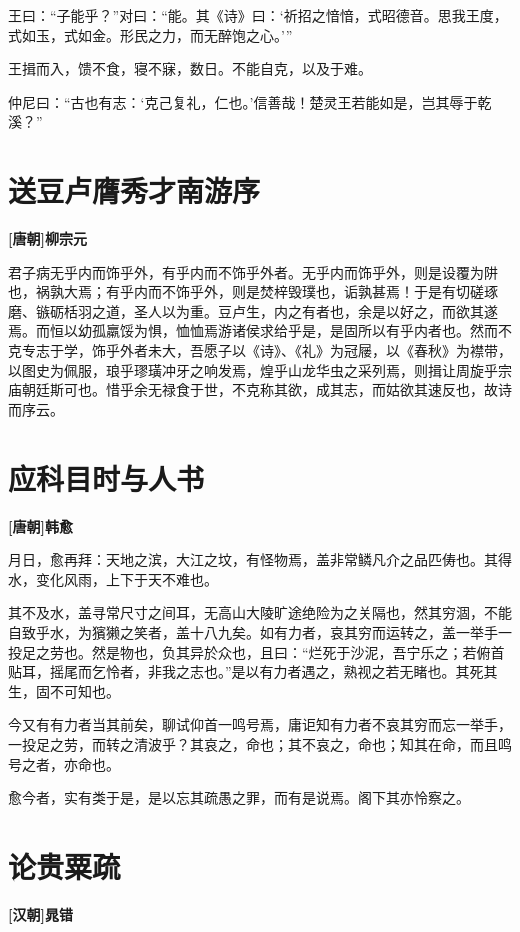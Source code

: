\documentclass[UTF8,titlepage,oneside]{ctexbook}
\begin{document}
王曰：“子能乎？”对曰：“能。其《诗》曰：‘祈招之愔愔，式昭德音。思我王度，式如玉，式如金。形民之力，而无醉饱之心。’”


王揖而入，馈不食，寝不寐，数日。不能自克，以及于难。


仲尼曰：“古也有志：‘克己复礼，仁也。’信善哉！楚灵王若能如是，岂其辱于乾溪？”



\chapter*{送豆卢膺秀才南游序}
\begin{center}
	\textbf{[唐朝]柳宗元}
\end{center}


君子病无乎内而饰乎外，有乎内而不饰乎外者。无乎内而饰乎外，则是设覆为阱也，祸孰大焉；有乎内而不饰乎外，则是焚梓毁璞也，诟孰甚焉！于是有切磋琢磨、镞砺栝羽之道，圣人以为重。豆卢生，内之有者也，余是以好之，而欲其遂焉。而恒以幼孤羸馁为惧，恤恤焉游诸侯求给乎是，是固所以有乎内者也。然而不克专志于学，饰乎外者未大，吾愿子以《诗》、《礼》为冠屦，以《春秋》为襟带，以图史为佩服，琅乎璆璜冲牙之响发焉，煌乎山龙华虫之采列焉，则揖让周旋乎宗庙朝廷斯可也。惜乎余无禄食于世，不克称其欲，成其志，而姑欲其速反也，故诗而序云。

\chapter*{应科目时与人书}
\begin{center}
	\textbf{[唐朝]韩愈}
\end{center}

月日，愈再拜：天地之滨，大江之坟，有怪物焉，盖非常鳞凡介之品匹俦也。其得水，变化风雨，上下于天不难也。

其不及水，盖寻常尺寸之间耳，无高山大陵旷途绝险为之关隔也，然其穷涸，不能自致乎水，为獱獭之笑者，盖十八九矣。如有力者，哀其穷而运转之，盖一举手一投足之劳也。然是物也，负其异於众也，且曰：“烂死于沙泥，吾宁乐之；若俯首贴耳，摇尾而乞怜者，非我之志也。”是以有力者遇之，熟视之若无睹也。其死其生，固不可知也。

今又有有力者当其前矣，聊试仰首一鸣号焉，庸讵知有力者不哀其穷而忘一举手，一投足之劳，而转之清波乎？其哀之，命也；其不哀之，命也；知其在命，而且鸣号之者，亦命也。

愈今者，实有类于是，是以忘其疏愚之罪，而有是说焉。阁下其亦怜察之。


\chapter*{论贵粟疏}
\begin{center}
	\textbf{[汉朝]晁错}
\end{center}
\end{document}
